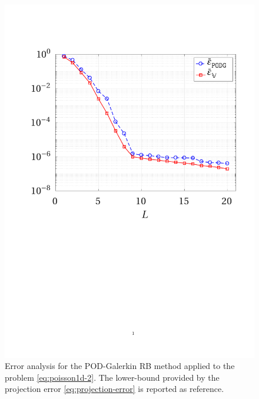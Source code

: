 \documentclass[12pt, a4paper, twoside, openright]{report}
\numberwithin{equation}{chapter}
\theoremstyle{theorem}
\theoremstyle{definition}
\theoremstyle{remark}
\theoremstyle{proposition}
\numberwithin{figure}{chapter}
\begin{document}
		\begin{figure}[b!]
			\center
			\includegraphics[scale = 0.43, trim = {1cm 10.5cm 1.5cm 3.5cm}, clip]{poisson1d_2_error_vs_rank}
			
			\caption{Error analysis for the POD-Galerkin RB method applied to the problem \eqref{eq:poisson1d-2}. The lower-bound provided by the projection error \eqref{eq:projection-error} is reported as reference.}
			\label{fig:poisson1d-2-fig1}
		\end{figure}
	
\end{document}
